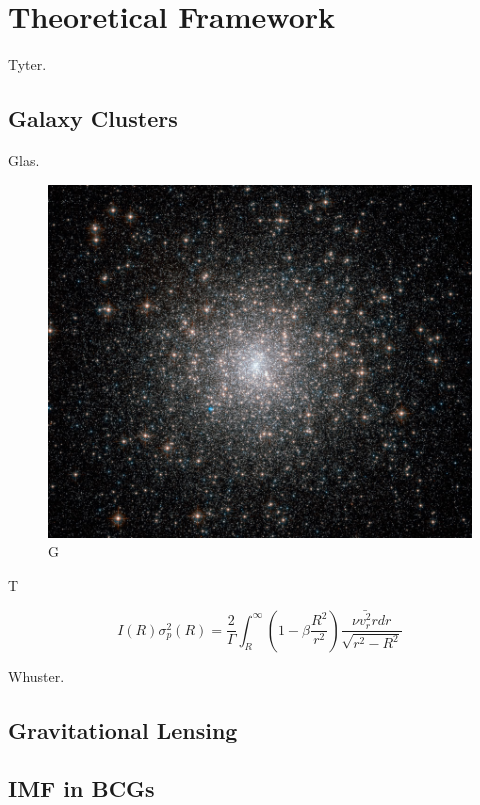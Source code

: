 \chapter{Theoretical Framework}

Tyter. 

\section{Galaxy Clusters}
 
Glas.

\begin{figure}[H]
\centering
\includegraphics[width=12cm]{images/m15.jpg}
\caption[M]{G}
\end{figure}

T 

\begin{equation}
I(R)\sigma_{p}^{2}(R)=\frac{2}{\Gamma}\int_{R}^{\infty}\left(1-\beta\frac{R^{2}}{r^{2}}\right)\frac{\nu\bar{v_{r}^{2}}rdr}{\sqrt{r^{2}-R^{2}}}
\end{equation}

Whuster.  

\section{Gravitational Lensing}

\section{IMF in BCGs}



